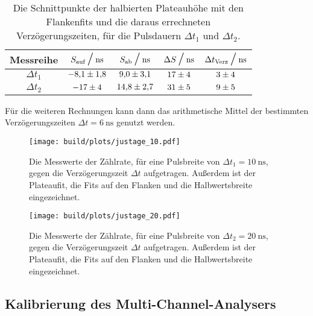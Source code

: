\begin{table}[H]
  \centering
    \caption{Die Schnittpunkte der halbierten Plateauhöhe mit den Flankenfits und die daraus errechneten Verzögerungszeiten, für die Pulsdauern $\Delta t_1$ und $\Delta t_2$.}
    \label{tab:schnitt}
    \begin{tabular}{S[table-format=2.1 ] | S[table-format=5.5] S[table-format=5.5] S[table-format=5.5] S[table-format=5.5] }
      \toprule
      {Messreihe} & {$S_\t{auf} \mathbin{\scalebox{1.5} /} \si{\nano\second}$} & {$S_\t{ab} \mathbin{\scalebox{1.5} /} \si{\nano\second}$}  & 
      {$\Delta S \mathbin{\scalebox{1.5} /} \si{\nano\second}$} & {$\Delta t_\t{Verz} \mathbin{\scalebox{1.5} /} \si{\nano\second}$ } \\
      \midrule
      \t{$\Delta t_1$} & $\num{-8.1 (18)}$      & $\num{9.0 (31)}$         & $ \num{17 (4)} $      & $ \num{3 (4)} $ \\
      \t{$\Delta t_2$} & $\num{-17 (04)}$    & $\num{14.8 (27)}$       & $ \num{31 (5)} $          & $\num{ 9 (5)} $ \\
      \bottomrule
    \end{tabular}
\end{table}

\noindent
Für die weiteren Rechnungen kann dann das arithmetische Mittel der bestimmten Verzögerungszeiten $\Delta t = \SI{6}{\nano\second}$ genutzt werden.



\begin{figure}[H]
  \centering
  \texttt{[image: build/plots/justage\_10.pdf]}
  \caption{Die Messwerte der Zählrate, für eine Pulsbreite von $\Delta t_1 = \SI{10}{\nano\second}$, gegen die Verzögerungszeit $\Delta t$ aufgetragen. 
  Außerdem ist der Plateaufit, die Fits auf den Flanken und die Halbwertsbreite eingezeichnet.}
  \label{img:just10}
\end{figure}

\begin{figure}[H]
  \centering
  \texttt{[image: build/plots/justage\_20.pdf]}
  \caption{Die Messwerte der Zählrate, für eine Pulsbreite von $\Delta t_2 = \SI{20}{\nano\second}$, gegen die Verzögerungszeit $\Delta t$ aufgetragen. 
  Außerdem ist der Plateaufit, die Fits auf den Flanken und die Halbwertsbreite eingezeichnet.}
  \label{img:just20}
\end{figure}


\subsection{Kalibrierung des Multi-Channel-Analysers}
\label{seq:MCA}

